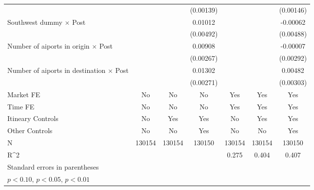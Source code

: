 \begin{table}[htbp]
\begin{tabular}{l*{6}{c}}
                    &                     &                     &   (0.00139)         &                     &                     &   (0.00146)         \\
\addlinespace
Southwest dummy $\times$ Post&                     &                     &     0.01012\sym{**} &                     &                     &    -0.00062         \\
                    &                     &                     &   (0.00492)         &                     &                     &   (0.00488)         \\
\addlinespace
Number of aiports in origin $\times$ Post&                     &                     &     0.00908\sym{***}&                     &                     &    -0.00007         \\
                    &                     &                     &   (0.00267)         &                     &                     &   (0.00292)         \\
\addlinespace
Number of aiports in destination $\times$ Post&                     &                     &     0.01302\sym{***}&                     &                     &     0.00482         \\
                    &                     &                     &   (0.00271)         &                     &                     &   (0.00303)         \\
\midrule
Market FE           &          No         &          No         &          No         &         Yes         &         Yes         &         Yes         \\
Time FE             &          No         &          No         &          No         &         Yes         &         Yes         &         Yes         \\
Itineary Controls   &          No         &         Yes         &         Yes         &          No         &         Yes         &         Yes         \\
Other Controls      &          No         &          No         &         Yes         &          No         &          No         &         Yes         \\
N                   &      130154         &      130154         &      130150         &      130154         &      130154         &      130150         \\
R^2                 &                     &                     &                     &       0.275         &       0.404         &       0.407         \\
\bottomrule
\multicolumn{7}{l}{\footnotesize Standard errors in parentheses}\\
\multicolumn{7}{l}{\footnotesize \sym{*} \(p<0.10\), \sym{**} \(p<0.05\), \sym{***} \(p<0.01\)}\\
\end{tabular}
\end{table}
